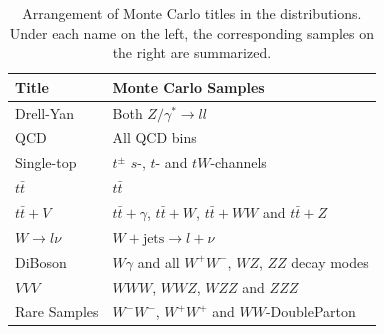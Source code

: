 \begin{table}[!htb]
  \centering
  \begin{tabular}{|l|l|}
    \hline
    Title & Monte Carlo Samples \\
    \hline
    Drell-Yan & Both $Z/\gamma^* \rightarrow ll$ \\
    QCD & All QCD bins \\
    Single-top & $t^\pm$ $s$-, $t$- and $tW$-channels \\
    $t \bar{t}$ & $t \bar{t}$ \\
    $t \bar{t} + V$ & $t \bar{t} + \gamma$, $t \bar{t} + W$, $t \bar{t} + WW$ and $t \bar{t} + Z$ \\
    $W \rightarrow l \nu$ & $W + \text{jets} \rightarrow l + \nu$ \\
    DiBoson & $W\gamma$ and all $W^+W^-$, $WZ$, $ZZ$ decay modes \\
    $VVV$ & $WWW$, $WWZ$, $WZZ$ and $ZZZ$ \\
    Rare Samples & $W^-W^-$, $W^+W^+$ and $WW$-DoubleParton \\
    \hline
  \end{tabular}
  \caption{Arrangement of Monte Carlo titles in the distributions. Under each name on the left, the corresponding samples on the right are summarized.}
  \label{tab:mcpooltitles}
\end{table}

